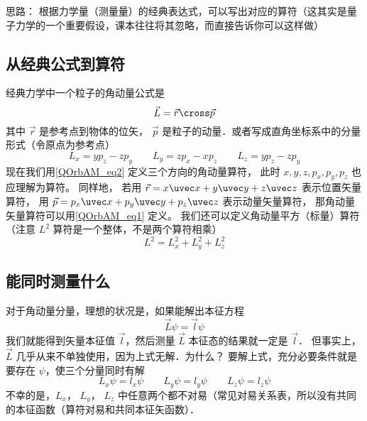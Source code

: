

思路： 根据力学量（测量量）的经典表达式，可以写出对应的算符（这其实是量子力学的一个重要假设，课本往往将其忽略，而直接告诉你可以这样做）

\subsection{从经典公式到算符}

经典力学中一个粒子的角动量公式是
\begin{equation}\label{QOrbAM_eq1}
\vec L = \vec r \cross \vec p
\end{equation}
其中 $\vec r$ 是参考点到物体的位矢， $\vec p$ 是粒子的动量．或者写成直角坐标系中的分量形式（令原点为参考点）
\begin{equation}\label{QOrbAM_eq2}
L_x = y p_z - z p_y \qquad
L_y = z p_x - x p_z \qquad
L_z = y p_z - z p_y
\end{equation}   
现在我们用\autoref{QOrbAM_eq2} 定义三个方向的角动量算符， 此时 $x, y, z, p_x, p_y, p_z$ 也应理解为算符。 同样地， 若用 $\vec r = x\uvec x + y\uvec y + z\uvec z$ 表示位置矢量算符， 用 $\vec p = p_x \uvec x + p_y\uvec y + p_z\uvec z$ 表示动量矢量算符， 那角动量矢量算符可以用\autoref{QOrbAM_eq1} 定义。 我们还可以定义角动量平方（标量）算符（注意 $L^2$ 算符是一个整体，不是两个算符相乘）
\begin{equation}
L^2 = L_x^2 + L_y^2 + L_z^2
\end{equation}

\subsection{能同时测量什么}

对于角动量分量，理想的状况是，如果能解出本征方程
\begin{equation}
\vec L \psi  = \vec l\psi 
\end{equation}
我们就能得到矢量本征值 $\vec l$，然后测量 $\vec L$ 本征态的结果就一定是 $\vec l$． 但事实上， $\vec L$ 几乎从来不单独使用，因为上式无解．为什么？ 要解上式，充分必要条件就是要存在 $\psi$，使三个分量同时有解
\begin{equation}
L_x \psi  = l_x \psi \qquad
L_y \psi  = l_y \psi \qquad
L_z \psi  = l_z \psi 
\end{equation}   
不幸的是，$L_x$， $L_y$， $L_z$ 中任意两个都不对易（常见对易关系表，所以没有共同的本征函数（算符对易和共同本征矢函数）．%

